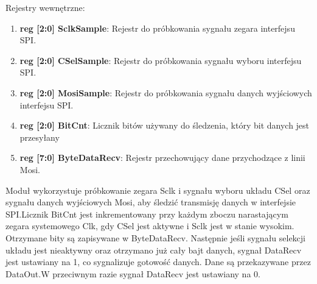 \documentclass[12pt, a4paper]{article}
\begin{document}
Rejestry wewnętrzne:

\begin{enumerate}
    \item \textbf{\fontsize{11}{10}\selectfont reg [2:0] SclkSample}: Rejestr do próbkowania sygnału zegara interfejsu SPI.
    \item \textbf{\fontsize{11}{10}\selectfont reg [2:0] CSelSample}: Rejestr do próbkowania sygnału wyboru interfejsu SPI.
     \item \textbf{\fontsize{11}{10}\selectfont reg [2:0] MosiSample}: Rejestr do próbkowania sygnału danych wyjściowych  interfejsu SPI.
    \item \textbf{\fontsize{11}{10}\selectfont reg [2:0] BitCnt}: Licznik bitów używany do śledzenia, który bit danych jest przesyłany
    \item \textbf{\fontsize{11}{10}\selectfont reg [7:0] ByteDataRecv}: Rejestr przechowujący dane przychodzące z linii Mosi.

\end{enumerate}


Moduł wykorzystuje próbkowanie zegara Sclk i sygnału wyboru układu CSel oraz sygnału danych wyjściowych Mosi, aby śledzić transmisję danych w interfejsie SPI.Licznik BitCnt jest inkrementowany przy każdym zboczu narastającym zegara systemowego Clk, gdy CSel jest aktywne i Sclk jest w stanie wysokim. Otrzymane bity są zapisywane w ByteDataRecv. Następnie jeśli sygnału selekcji układu jest nieaktywny oraz otrzymano już cały bajt danych, sygnał DataRecv jest ustawiany na 1, co sygnalizuje gotowość danych. Dane są przekazywane przez DataOut.W przeciwnym razie sygnał DataRecv jest ustawiany na 0.
\end{document}
